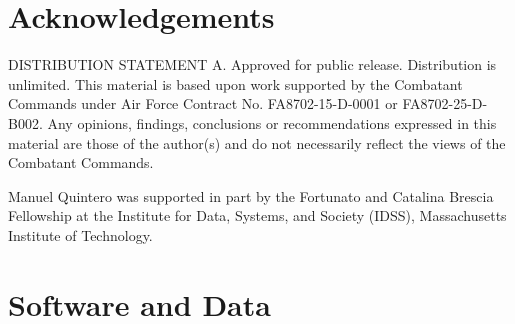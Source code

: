 \documentclass{article}
\theoremstyle{definition}
\begin{document}






% 
% 





\section*{Acknowledgements}

DISTRIBUTION STATEMENT A. Approved for public release. Distribution is unlimited. This material is based upon work supported by the Combatant Commands under Air Force Contract No. FA8702-15-D-0001 or FA8702-25-D-B002. Any opinions, findings, conclusions or recommendations expressed in this material are those of the author(s) and do not necessarily reflect the views of the Combatant Commands.

Manuel Quintero was supported in part by the Fortunato and Catalina Brescia Fellowship at the Institute for Data, Systems, and Society (IDSS), Massachusetts Institute of Technology.


\section*{Software and Data}
\end{document}
